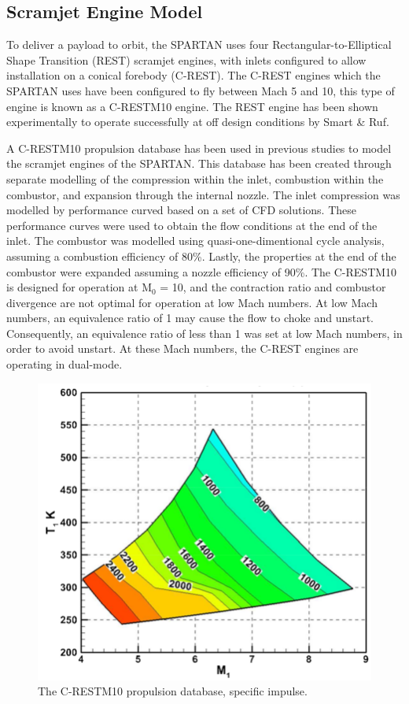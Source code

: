 \subsection{Scramjet Engine Model}\label{sec:enginemodel}

To deliver a payload to orbit, the SPARTAN uses four Rectangular-to-Elliptical Shape Transition (REST) scramjet engines, with inlets configured to allow installation on a conical forebody (C-REST). The C-REST engines which the SPARTAN uses have been configured to fly between Mach 5 and 10, this type of engine is known as a C-RESTM10 engine\cite{Preller2017}. The REST engine has been shown experimentally to operate successfully at off design conditions by Smart \& Ruf\cite{Smart2006}. 

A C-RESTM10 propulsion database has been used in previous studies to model the scramjet engines of the SPARTAN\cite{Preller2017}. This database has been created through separate modelling of the compression within the inlet, combustion within the combustor, and expansion through the internal nozzle\cite{Preller2018}. The inlet compression was modelled by performance curved based on a set of CFD solutions\cite{Preller2018}. These performance curves were used to obtain the flow conditions at the end of the inlet. The combustor was modelled using quasi-one-dimentional cycle analysis, assuming a combustion efficiency of 80\%\cite{Preller2018}. Lastly, the properties at the end of the combustor were expanded assuming a nozzle efficiency of 90\%\cite{Preller2018}.
The C-RESTM10 is designed for operation at M$_0$ = 10, and the contraction ratio and combustor divergence are not optimal for operation at low Mach numbers. At low Mach numbers, an equivalence ratio of 1 may cause the flow to choke and unstart. 
Consequently, an equivalence ratio of less than 1 was set at low Mach numbers, in order to avoid unstart\cite{Preller2018}. At these Mach numbers, the C-REST engines are operating in dual-mode\cite{Preller2018}. 


\begin{figure}
	\centering
	\includegraphics[width=0.7\linewidth]{figures/2_literature-review/C-REST}
	\caption{The C-RESTM10 propulsion database, specific impulse.}
	\label{fig:C-REST}
\end{figure}





